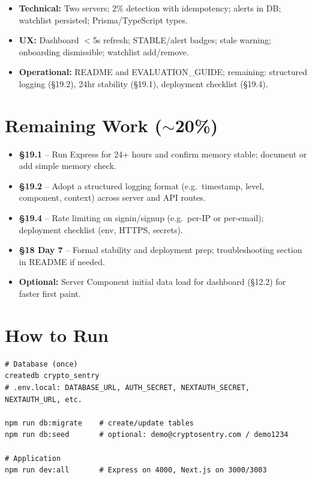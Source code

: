 \documentclass[11pt,a4paper]{report}
\begin{document}
\begin{itemize}[leftmargin=*]
  \item \textbf{Technical:} Two servers; 2\% detection with idempotency; alerts in DB; watchlist persisted; Prisma/TypeScript types.
  \item \textbf{UX:} Dashboard $<$5s refresh; STABLE/alert badges; stale warning; onboarding dismissible; watchlist add/remove.
  \item \textbf{Operational:} README and EVALUATION\_GUIDE; remaining: structured logging (\S19.2), 24hr stability (\S19.1), deployment checklist (\S19.4).
\end{itemize}

\chapter{Remaining Work ($\sim$20\%)}

\begin{itemize}[leftmargin=*]
  \item \textbf{\S19.1} -- Run Express for 24+ hours and confirm memory stable; document or add simple memory check.
  \item \textbf{\S19.2} -- Adopt a structured logging format (e.g.\ timestamp, level, component, context) across server and API routes.
  \item \textbf{\S19.4} -- Rate limiting on signin/signup (e.g.\ per-IP or per-email); deployment checklist (env, HTTPS, secrets).
  \item \textbf{\S18 Day 7} -- Formal stability and deployment prep; troubleshooting section in README if needed.
  \item \textbf{Optional:} Server Component initial data load for dashboard (\S12.2) for faster first paint.
\end{itemize}

\chapter{How to Run}

\begin{lstlisting}
# Database (once)
createdb crypto_sentry
# .env.local: DATABASE_URL, AUTH_SECRET, NEXTAUTH_SECRET, NEXTAUTH_URL, etc.

npm run db:migrate    # create/update tables
npm run db:seed       # optional: demo@cryptosentry.com / demo1234

# Application
npm run dev:all       # Express on 4000, Next.js on 3000/3003
\end{lstlisting}
\end{document}
